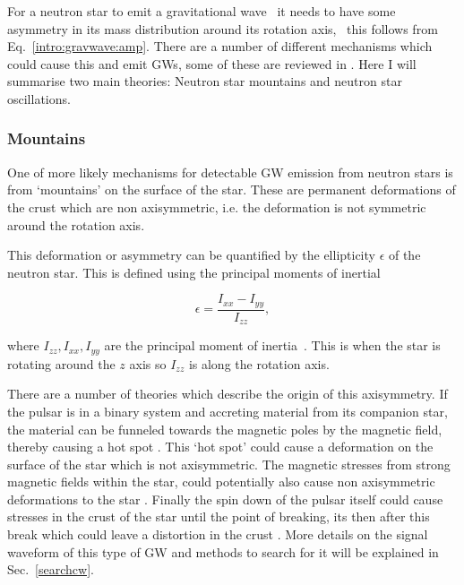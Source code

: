 For a neutron star to emit a gravitational wave~ it needs to have some asymmetry in its mass distribution around its
rotation axis,~ this follows from
Eq.~\ref{intro:gravwave:amp}.  There are a number of different mechanisms which
could cause this and emit \glspl{GW}, some of these are reviewed in
\citep{glampedakis2017GravitationalWaves,riles2017RecentSearches,haskell2015DetectingGravitational,lasky2015GravitationalWaves}.
Here I will summarise two main theories: Neutron star mountains and neutron
star oscillations.

\subsubsection{\label{intro:source:cw:mountain}Mountains}

One of more likely mechanisms for detectable \gls{GW} emission from neutron
stars is from `mountains' on the surface of the star.  These are permanent
deformations of the crust which are non axisymmetric, i.e. the deformation is
not symmetric around the rotation axis.

This deformation or asymmetry can be quantified by the ellipticity $\epsilon$ of the neutron star.
This is defined using the principal moments of inertial

\begin{equation}
\label{ellipticity}
\epsilon = \frac{I_{xx}-I_{yy}}{I_{zz}},
\end{equation}

where $I_{zz},I_{xx},I_{yy}$ are the principal moment of inertia~.
This is when the star is rotating around the $z$ axis so $I_{zz}$ is along the
rotation axis.~ 

There are a number of theories which describe the origin of this axisymmetry.
If the pulsar is in a binary system and accreting material from its companion
star, the material can be funneled towards the magnetic poles by the magnetic
field, thereby causing a hot spot \citep{haskell2015DetectingGravitational}.
This `hot spot' could cause a deformation on the surface of the star which is
not axisymmetric.  The magnetic stresses from strong magnetic fields within the
star, could potentially also cause non axisymmetric deformations to the star
\citep{}.  Finally the spin down of the pulsar itself could cause stresses in
the crust of the star until the point of breaking, its then after this break
which could leave a distortion in the crust \citep{becker2009NeutronStars}.
More details on the signal waveform of this type of \gls{GW} and methods to
search for it will be explained in Sec.~\ref{searchcw}.
 
